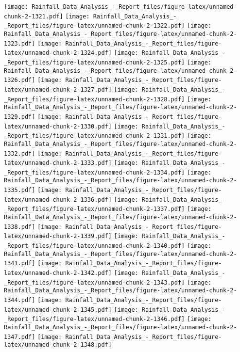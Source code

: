 \documentclass[
]{article}
\begin{document}
\texttt{[image: Rainfall\_Data\_Analysis\_-\_Report\_files/figure-latex/unnamed-chunk-2-1321.pdf]}
\texttt{[image: Rainfall\_Data\_Analysis\_-\_Report\_files/figure-latex/unnamed-chunk-2-1322.pdf]}
\texttt{[image: Rainfall\_Data\_Analysis\_-\_Report\_files/figure-latex/unnamed-chunk-2-1323.pdf]}
\texttt{[image: Rainfall\_Data\_Analysis\_-\_Report\_files/figure-latex/unnamed-chunk-2-1324.pdf]}
\texttt{[image: Rainfall\_Data\_Analysis\_-\_Report\_files/figure-latex/unnamed-chunk-2-1325.pdf]}
\texttt{[image: Rainfall\_Data\_Analysis\_-\_Report\_files/figure-latex/unnamed-chunk-2-1326.pdf]}
\texttt{[image: Rainfall\_Data\_Analysis\_-\_Report\_files/figure-latex/unnamed-chunk-2-1327.pdf]}
\texttt{[image: Rainfall\_Data\_Analysis\_-\_Report\_files/figure-latex/unnamed-chunk-2-1328.pdf]}
\texttt{[image: Rainfall\_Data\_Analysis\_-\_Report\_files/figure-latex/unnamed-chunk-2-1329.pdf]}
\texttt{[image: Rainfall\_Data\_Analysis\_-\_Report\_files/figure-latex/unnamed-chunk-2-1330.pdf]}
\texttt{[image: Rainfall\_Data\_Analysis\_-\_Report\_files/figure-latex/unnamed-chunk-2-1331.pdf]}
\texttt{[image: Rainfall\_Data\_Analysis\_-\_Report\_files/figure-latex/unnamed-chunk-2-1332.pdf]}
\texttt{[image: Rainfall\_Data\_Analysis\_-\_Report\_files/figure-latex/unnamed-chunk-2-1333.pdf]}
\texttt{[image: Rainfall\_Data\_Analysis\_-\_Report\_files/figure-latex/unnamed-chunk-2-1334.pdf]}
\texttt{[image: Rainfall\_Data\_Analysis\_-\_Report\_files/figure-latex/unnamed-chunk-2-1335.pdf]}
\texttt{[image: Rainfall\_Data\_Analysis\_-\_Report\_files/figure-latex/unnamed-chunk-2-1336.pdf]}
\texttt{[image: Rainfall\_Data\_Analysis\_-\_Report\_files/figure-latex/unnamed-chunk-2-1337.pdf]}
\texttt{[image: Rainfall\_Data\_Analysis\_-\_Report\_files/figure-latex/unnamed-chunk-2-1338.pdf]}
\texttt{[image: Rainfall\_Data\_Analysis\_-\_Report\_files/figure-latex/unnamed-chunk-2-1339.pdf]}
\texttt{[image: Rainfall\_Data\_Analysis\_-\_Report\_files/figure-latex/unnamed-chunk-2-1340.pdf]}
\texttt{[image: Rainfall\_Data\_Analysis\_-\_Report\_files/figure-latex/unnamed-chunk-2-1341.pdf]}
\texttt{[image: Rainfall\_Data\_Analysis\_-\_Report\_files/figure-latex/unnamed-chunk-2-1342.pdf]}
\texttt{[image: Rainfall\_Data\_Analysis\_-\_Report\_files/figure-latex/unnamed-chunk-2-1343.pdf]}
\texttt{[image: Rainfall\_Data\_Analysis\_-\_Report\_files/figure-latex/unnamed-chunk-2-1344.pdf]}
\texttt{[image: Rainfall\_Data\_Analysis\_-\_Report\_files/figure-latex/unnamed-chunk-2-1345.pdf]}
\texttt{[image: Rainfall\_Data\_Analysis\_-\_Report\_files/figure-latex/unnamed-chunk-2-1346.pdf]}
\texttt{[image: Rainfall\_Data\_Analysis\_-\_Report\_files/figure-latex/unnamed-chunk-2-1347.pdf]}
\texttt{[image: Rainfall\_Data\_Analysis\_-\_Report\_files/figure-latex/unnamed-chunk-2-1348.pdf]}
\end{document}
